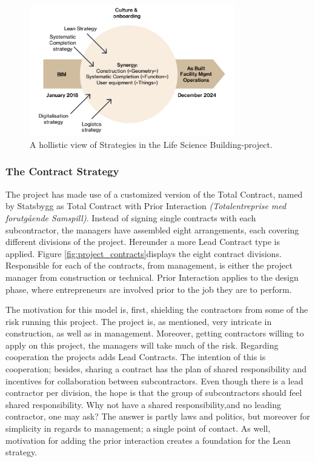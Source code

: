 \begin{figure}
    \centering
    \includegraphics[width=0.8\textwidth]{fig/LVB_strategy.png}
    \caption{A hollistic view of Strategies in the Life Science Building-project.}
    \label{fig:strategy}
\end{figure}

\subsubsection*{The Contract Strategy}
The project has made use of a customized version of the Total Contract, named by Statsbygg as Total Contract with Prior Interaction \textit{(Totalentreprise med forutgående Samspill)}. Instead of signing single contracts with each subcontractor, the managers have assembled eight arrangements, each covering different divisions of the project. Hereunder a more Lead Contract type is applied. Figure \ref{fig:project_contracts}displays the eight contract divisions. Responsible for each of the contracts, from management, is either the project manager from construction or technical. Prior Interaction applies to the design phase, where entrepreneurs are involved prior to the job they are to perform. 

The motivation for this model is, first, shielding the contractors from some of the risk running this project. The project is, as mentioned, very intricate in construction, as well as in management. Moreover, getting contractors willing to apply on this project, the managers will take much of the risk. Regarding cooperation the projects adds Lead Contracts. The intention of this is cooperation; besides, sharing a contract has the plan of shared responsibility and incentives for collaboration between subcontractors. Even though there is a lead contractor per division, the hope is that the group of subcontractors should feel shared responsibility. Why not have a shared responsibility,and no leading contractor, one may ask? The answer is partly laws and politics, but moreover for simplicity in regards to management; a single point of contact. As well, motivation for adding the prior interaction creates a foundation for the Lean strategy.

